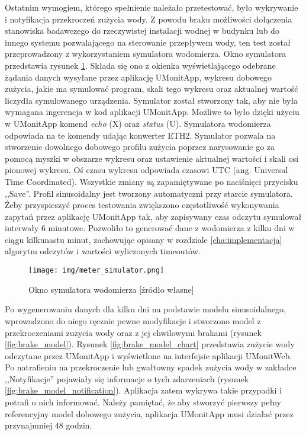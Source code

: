 Ostatnim wymogiem, którego spełnienie należało przetestować, było wykrywanie i notyfikacja przekroczeń zużycia wody.
Z powodu braku możliwości dołączenia stanowiska badawczego do rzeczywistej instalacji wodnej w budynku lub do innego systemu pozwalającego na sterowanie przepływem wody, ten test został przeprowadzony z wykorzystaniem symulatora wodomierza.
Okno symulatora przedstawia rysunek \ref{fig:meter_simulator}.
Składa się ono z okienka wyświetlającego odebrane żądania danych wysyłane przez aplikację UMonitApp, wykresu dobowego zużycia, jakie ma symulować program, skali tego wykresu oraz aktualnej wartość liczydła symulowanego urządzenia.
Symulator został stworzony tak, aby nie była wymagana ingerencja w kod aplikacji UMonitApp.
Możliwe to było dzięki użyciu w UMonitApp komend \textit{echo} (X) oraz \textit{status} (U).
Symulatora wodomierza odpowiada na te komendy udając konwerter ETH2.
Symulator pozwala na stworzenie dowolnego dobowego profilu zużycia poprzez narysowanie go za pomocą myszki w obszarze wykresu oraz ustawienie aktualnej wartości i skali osi pionowej wykresu.
Oś czasu wykresu odpowiada czasowi UTC (ang. Universal Time Coordinated).
Wszystkie zmiany są zapamiętywane po naciśnięci przycisku ,,Save''.
Profil sinusoidalny jest tworzony automatyczni przy starcie symulatora.
Żeby przyspieszyć proces testowania zwiększono częstotliwość wykonywania zapytań przez aplikację UMonitApp tak, aby zapisywany czas odczytu symulował interwały 6 minutowe.
Pozwoliło to generować dane z wodomierza z kilku dni w ciągu kilkunastu minut, zachowując opisany w rozdziale \ref{cha:implementacja} algorytm odczytów i wartości wyliczonych timeoutów.

\begin{figure}[ht]
	\centering
	\texttt{[image: img/meter\_simulator.png]}
	\caption[Okno symulatora wodomierza]{Okno symulatora wodomierza [źródło własne]}
	\label{fig:meter_simulator}
\end{figure}

Po wygenerowaniu danych dla kilku dni na podstawie modelu sinusoidalnego, wprowadzono do niego ręcznie pewne modyfikacje i stworzono model z przekroczeniami zużycia wody oraz z jej chwilowymi brakami (rysunek \ref{fig:brake_model}).
Rysunek \ref{fig:brake_model_chart} przedstawia zużycie wody odczytane przez UMonitApp i wyświetlone na interfejsie aplikacji UMonitWeb.
Po natrafieniu na przekroczenie lub gwałtowny spadek zużycia wody w zakładce ,,Notyfikacje'' pojawiały się informacje o tych zdarzeniach (rysunek \ref{fig:brake_model_notification}).
Aplikacja zatem wykrywa takie przypadki i potrafi o nich informować.
Należy pamiętać, że aby stworzyć pierwszy pełny referencyjny model dobowego zużycia, aplikacja UMonitApp musi działać przez przynajmniej $ 48 $ godzin.

